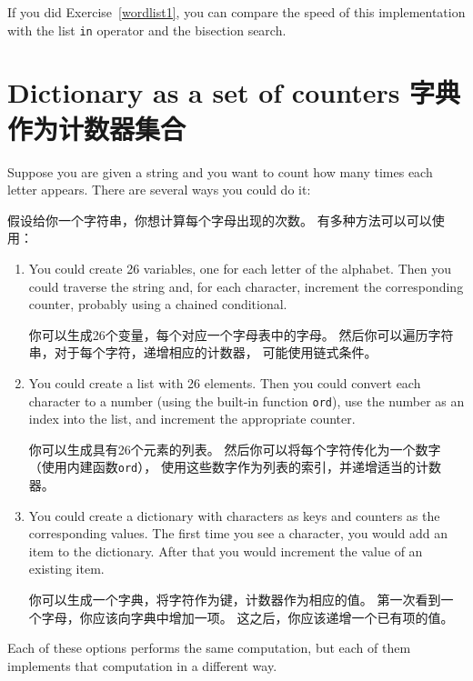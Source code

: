 \documentclass[10pt]{book}
\begin{document}
\begin{CJK}{UTF8}{gbsn}
\begin{exercise}
If you did Exercise~\ref{wordlist1}, you can compare the speed
of this implementation with the list {\tt in} operator and the
bisection search.

\end{exercise}


\section{Dictionary as a set of counters 字典作为计数器集合}
\label{histogram}

Suppose you are given a string and you want to count how many
times each letter appears.  There are several ways you could do it:

假设给你一个字符串，你想计算每个字母出现的次数。
有多种方法可以可以使用：

\begin{enumerate}

\item You could create 26 variables, one for each letter of the
alphabet.  Then you could traverse the string and, for each
character, increment the corresponding counter, probably using
a chained conditional.

你可以生成26个变量，每个对应一个字母表中的字母。
然后你可以遍历字符串，对于每个字符，递增相应的计数器，
可能使用链式条件。

\item You could create a list with 26 elements.  Then you could
convert each character to a number (using the built-in function
{\tt ord}), use the number as an index into the list, and increment
the appropriate counter.

你可以生成具有26个元素的列表。
然后你可以将每个字符传化为一个数字（使用内建函数{\tt ord}），
使用这些数字作为列表的索引，并递增适当的计数器。

\item You could create a dictionary with characters as keys
and counters as the corresponding values.  The first time you
see a character, you would add an item to the dictionary.  After
that you would increment the value of an existing item.

你可以生成一个字典，将字符作为键，计数器作为相应的值。
第一次看到一个字母，你应该向字典中增加一项。
这之后，你应该递增一个已有项的值。

\end{enumerate}

Each of these options performs the same computation, but each
of them implements that computation in a different way.


\end{CJK}
\end{document}
